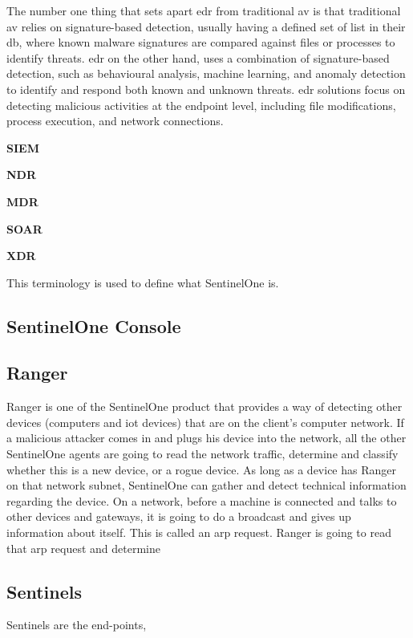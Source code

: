 \begin{multicols}{2}
      The number one thing that sets apart \acrshort{edr} from traditional \acrshort{av} is that traditional \acrshort{av} relies on
      signature-based detection, usually having a defined set of list in their \acrshort{db}, where known malware signatures are compared
      against files or processes to identify threats. \acrshort{edr} on the other hand, uses a combination of signature-based detection, such
      as behavioural analysis, machine learning, and anomaly detection to identify and respond both known and unknown threats. \acrshort{edr}
      solutions focus on detecting malicious activities at the endpoint level, including file modifications, process execution, and network
      connections.

      \textbf{SIEM}

      \textbf{NDR} \label{sec:ndr}

      \textbf{MDR}

      \textbf{SOAR}

      \textbf{XDR}

      This terminology is used to define what SentinelOne is.

      \subsection{SentinelOne Console}
      \subsection{Ranger}
      Ranger is one of the SentinelOne product that provides a way of detecting other devices (computers and
      \acrshort{iot} devices) that are on the client's computer network. If a malicious attacker comes in and plugs his device
      into the network, all the other SentinelOne agents are going to read the network traffic, determine and classify whether
      this is a new device, or a rogue device. As long as a device has Ranger on that network subnet, SentinelOne can gather and
      detect technical information regarding the device. On a network, before a machine is connected and talks to other devices
      and gateways, it is going to do a broadcast and gives up information about itself. This is called an \acrshort{arp} request.
      Ranger is going to read that \acrshort{arp} request and determine

      \subsection{Sentinels}
      Sentinels are the end-points,

\end{multicols}
